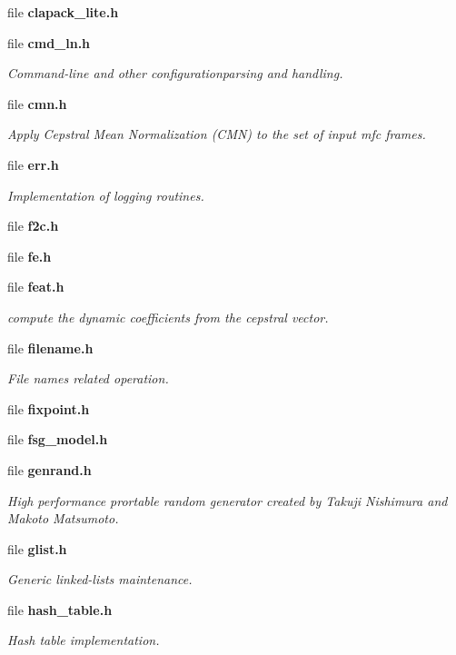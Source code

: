 \begin{DoxyCompactItemize}
file {\bfseries clapack\+\_\+lite.\+h}
\item 
file {\bf cmd\+\_\+ln.\+h}
\begin{DoxyCompactList}\small\item\em Command-\/line and other configurationparsing and handling. \end{DoxyCompactList}\item 
file {\bf cmn.\+h}
\begin{DoxyCompactList}\small\item\em Apply Cepstral Mean Normalization (C\+M\+N) to the set of input mfc frames. \end{DoxyCompactList}\item 
file {\bf err.\+h}
\begin{DoxyCompactList}\small\item\em Implementation of logging routines. \end{DoxyCompactList}\item 
file {\bfseries f2c.\+h}
\item 
file {\bfseries fe.\+h}
\item 
file {\bf feat.\+h}
\begin{DoxyCompactList}\small\item\em compute the dynamic coefficients from the cepstral vector. \end{DoxyCompactList}\item 
file {\bf filename.\+h}
\begin{DoxyCompactList}\small\item\em File names related operation. \end{DoxyCompactList}\item 
file {\bfseries fixpoint.\+h}
\item 
file {\bfseries fsg\+\_\+model.\+h}
\item 
file {\bf genrand.\+h}
\begin{DoxyCompactList}\small\item\em High performance prortable random generator created by Takuji Nishimura and Makoto Matsumoto. \end{DoxyCompactList}\item 
file {\bf glist.\+h}
\begin{DoxyCompactList}\small\item\em Generic linked-\/lists maintenance. \end{DoxyCompactList}\item 
file {\bf hash\+\_\+table.\+h}
\begin{DoxyCompactList}\small\item\em Hash table implementation. \end{DoxyCompactList}\item 

\end{DoxyCompactItemize}

